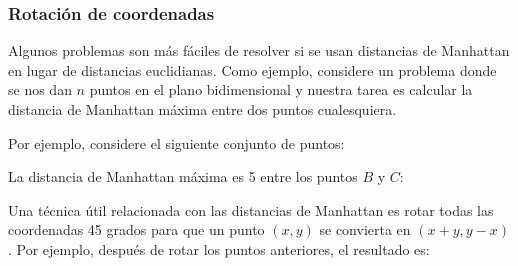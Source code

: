 \subsubsection{Rotación de coordenadas}

Algunos problemas son más fáciles de resolver si
se usan distancias de Manhattan en lugar de distancias euclidianas.
Como ejemplo, considere un problema donde se nos dan
$n$ puntos en el plano bidimensional
y nuestra tarea es calcular la distancia de Manhattan máxima
entre dos puntos cualesquiera.

Por ejemplo, considere el siguiente conjunto de puntos:
\begin{center}
\end{center}
La distancia de Manhattan máxima es 5
entre los puntos $B$ y $C$:
\begin{center}
\end{center}

Una técnica útil relacionada con las distancias de Manhattan
es rotar todas las coordenadas 45 grados para que
un punto $(x,y)$ se convierta en $(x+y,y-x)$.
Por ejemplo, después de rotar los puntos anteriores,
el resultado es:

